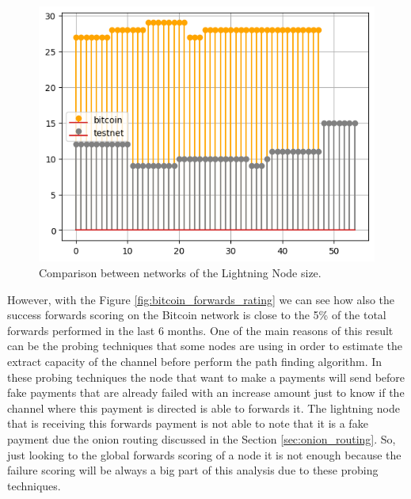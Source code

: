 \begin{figure}[H]
    \begin{center}
      \includegraphics[scale=0.7]{imgs/bitcoin_vs_testnet_channels_size.png}
    \end{center}
    \caption{Comparison between networks of the Lightning Node size.}
    \label{fig:bitcoin_vs_testnet_channels_size}
\end{figure}

However, with the Figure \ref{fig:bitcoin_forwards_rating} we can see how also the success forwards scoring 
on the Bitcoin network is close to the 5\% of the total forwards performed in the last 6 months. One of the main 
reasons of this result can be the probing techniques that some nodes are using in order to estimate the extract capacity
of the channel before perform the path finding algorithm. In these probing techniques the node that want to make a payments
will send before fake payments that are already failed with an increase amount just to know if the channel where this 
payment is directed is able to forwards it. The lightning node that is receiving this forwards payment is not able to 
note that it is a fake payment due the onion routing discussed in the Section \ref{sec:onion_routing}.
So, just looking to the global forwards scoring 
of a node it is not enough because the failure scoring will be always a big part of this analysis due to 
these probing techniques.


